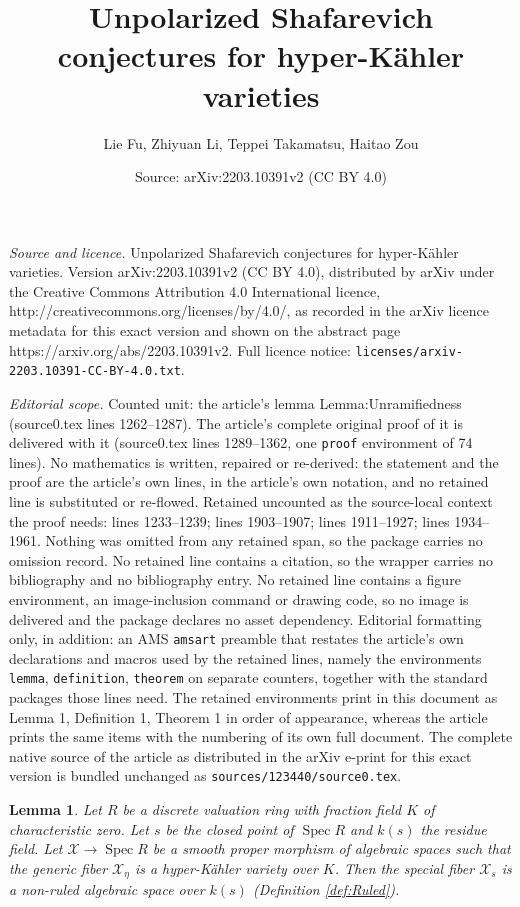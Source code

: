 \documentclass[10pt,a4paper]{amsart}
\title{Unpolarized Shafarevich conjectures for hyper-K{\"a}hler varieties}
\author{Lie Fu, Zhiyuan Li, Teppei Takamatsu, Haitao Zou}
\date{Source: arXiv:2203.10391v2 (CC BY 4.0)}
\newtheorem{lemma}{Lemma}
\DeclareMathOperator{\Spec}{Spec}
\begin{document}
\maketitle

\noindent\emph{Source and licence.} Unpolarized Shafarevich conjectures for hyper-K{\"a}hler varieties. Version arXiv:2203.10391v2 (CC BY 4.0), distributed by arXiv under the Creative Commons Attribution 4.0 International licence, http://creativecommons.org/licenses/by/4.0/, as recorded in the arXiv licence metadata for this exact version and shown on the abstract page https://arxiv.org/abs/2203.10391v2. Full licence notice: \texttt{licenses/arxiv-2203.10391-CC-BY-4.0.txt}.\par\smallskip

\noindent\textit{Editorial scope.} Counted unit: the article's lemma Lemma:Unramifiedness (source0.tex lines 1262--1287). The article's complete original proof of it is delivered with it (source0.tex lines 1289--1362, one \texttt{proof} environment of 74 lines). No mathematics is written, repaired or re-derived: the statement and the proof are the article's own lines, in the article's own notation, and no retained line is substituted or re-flowed.  Retained uncounted as the source-local context the proof needs: lines 1233--1239; lines 1903--1907; lines 1911--1927; lines 1934--1961.  Nothing was omitted from any retained span, so the package carries no omission record.  No retained line contains a citation, so the wrapper carries no bibliography and no bibliography entry.  No retained line contains a figure environment, an image-inclusion command or drawing code, so no image is delivered and the package declares no asset dependency.  Editorial formatting only, in addition: an AMS \texttt{amsart} preamble that restates the article's own declarations and macros used by the retained lines, namely the environments \texttt{lemma}, \texttt{definition}, \texttt{theorem} on separate counters, together with the standard packages those lines need.  The retained environments print in this document as Lemma 1, Definition 1, Theorem 1 in order of appearance, whereas the article prints the same items with the numbering of its own full document.  The complete native source of the article as distributed in the arXiv e-print for this exact version is bundled unchanged as \texttt{sources/123440/source0.tex}.
\begin{lemma}
\label{ruled}
Let $R$ be a discrete valuation ring with fraction field $K$ of characteristic zero.
Let $s$ be the closed point of $\Spec R$ and $k(s)$ the residue field.
Let $\mathcal{X} \rightarrow \Spec R$ be a smooth proper morphism of algebraic spaces such that the generic fiber $\mathcal{X}_{\eta}$ is a hyper-Kähler variety over $K$.
Then the special fiber $\mathcal{X}_{s}$ is a non-ruled algebraic space over $k(s)$ (Definition \ref{def:Ruled}).
\end{lemma}
\end{document}
